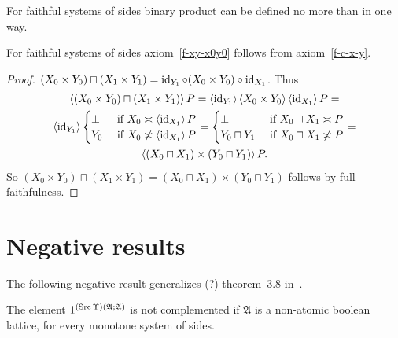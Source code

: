 \begin{cor}
For faithful systems of sides binary product can be defined no more than in one way.
\end{cor}

\begin{prop}
For faithful systems of sides axiom~\ref{f-xy-x0y0} follows from axiom~\ref{f-c-x-y}.
\end{prop}

\begin{proof}
$(X_0\times Y_0)\sqcap(X_1\times Y_1) = \operatorname{id}_{Y_1}\circ(X_0\times Y_0)\circ\operatorname{id}_{X_1}$.
Thus
\begin{multline*}
\left\langle (X_0\times Y_0)\sqcap(X_1\times Y_1)\right\rangle P = \left\langle \operatorname{id}_{Y_1}\right\rangle\left\langle X_0\times Y_0\right\rangle\left\langle \operatorname{id}_{X_1}\right\rangle P = \\
\left\langle \operatorname{id}_{Y_1}\right\rangle\begin{cases}\bot&\text{ if }X_0\asymp\left\langle \operatorname{id}_{X_1}\right\rangle P\\Y_0&\text{ if }X_0\not\asymp\left\langle \operatorname{id}_{X_1}\right\rangle P\end{cases} =
\begin{cases}\bot&\text{ if }X_0\sqcap X_1\asymp P\\Y_0\sqcap Y_1&\text{ if }X_0\sqcap X_1\not\asymp P\end{cases} = \\
\left\langle (X_0\sqcap X_1)\times(Y_0\sqcap Y_1)\right\rangle P.
\end{multline*}
So $(X_0\times Y_0)\sqcap(X_1\times Y_1) = (X_0\sqcap X_1)\times(Y_0\sqcap Y_1)$ follows by full faithfulness.
\end{proof}



\section{Negative results}

The following negative result generalizes (?) theorem~3.8 in~\cite{tprod-dist-lat}.

\begin{prop}
  The element $1^{(\operatorname{Src}\Upsilon)(\mathfrak{A}; \mathfrak{A})}$ is not
  complemented if $\mathfrak{A}$ is a non-atomic boolean lattice,
  for every monotone system of sides.
\end{prop}


